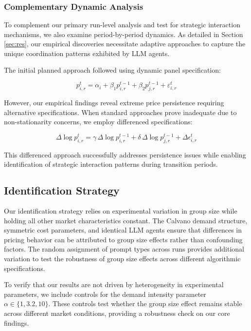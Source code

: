 \subsubsection*{Complementary Dynamic Analysis}

To complement our primary run-level analysis and test for strategic interaction mechanisms, we also examine period-by-period dynamics. As detailed in Section \ref{sec:res}, our empirical discoveries necessitate adaptive approaches to capture the unique coordination patterns exhibited by LLM agents.

The initial planned approach followed \textcite{fish_algorithmic_2025} using dynamic panel specification:

\begin{equation}\label{eq:dynamic_panel}
    p_{i,r}^t = \alpha_i + \beta_1 p_{i,r}^{t-1} + \beta_2 p_{j,r}^{t-1} + \varepsilon_{i,r}^t
\end{equation}

However, our empirical findings reveal extreme price persistence requiring alternative specifications. When standard approaches prove inadequate due to non-stationarity concerns, we employ differenced specifications:

\begin{equation}\label{eq:differenced_fe}
    \Delta \log p_{i,r}^{t} = \gamma \, \Delta \log p_{i,r}^{t-1} + \delta \, \Delta \log p_{j,r}^{t-1} + \Delta \epsilon_{i,r}^t
\end{equation}

This differenced approach successfully addresses persistence issues while enabling identification of strategic interaction patterns during transition periods.

\subsection{Identification Strategy}

Our identification strategy relies on experimental variation in group size while holding all other market characteristics constant. The Calvano demand structure, symmetric cost parameters, and identical LLM agents ensure that differences in pricing behavior can be attributed to group size effects rather than confounding factors. The random assignment of prompt types across runs provides additional variation to test the robustness of group size effects across different algorithmic specifications.

To verify that our results are not driven by heterogeneity in experimental parameters, we include controls for the demand intensity parameter $\alpha \in \{1, 3.2, 10\}$. These controls test whether the group size effect remains stable across different market conditions, providing a robustness check on our core findings.

